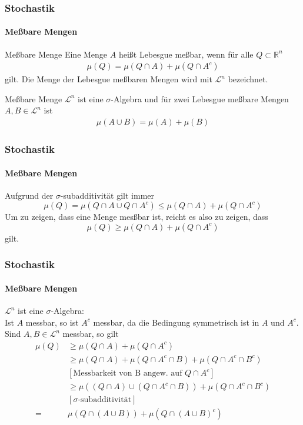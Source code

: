 \documentclass{beamer}
\begin{document}
\begin{frame}
    \frametitle{Stochastik}
\framesubtitle{Meßbare Mengen}
    \begin{block}{Meßbare Menge}
Eine Menge $A$ heißt Lebesgue meßbar, wenn für alle $Q \subset \mathbb{R}^n$
\begin{align*}
\mu(Q) = \mu(Q \cap A) + \mu(Q \cap A^c)  
\end{align*}
gilt. Die Menge der Lebesgue meßbaren Mengen wird mit $\mathcal{L}^n$ bezeichnet.
\end{block}


    \begin{block}{Meßbare Menge}
$\mathcal{L}^n$ ist eine $\sigma$-Algebra und für  zwei Lebesgue meßbare Mengen  $A,B \in \mathcal{L}^n$ ist
\begin{align*}
 \mu(A \cup B) = \mu(A) + \mu(B)
\end{align*}

\end{block}

 \end{frame}


 \begin{frame}
    \frametitle{Stochastik}
\framesubtitle{Meßbare Mengen}
Aufgrund der $\sigma$-subadditivität gilt immer
$$ \mu(Q) = \mu(Q \cap A \cup Q \cap A^c) \leq \mu(Q \cap A) +  \mu(Q \cap A^c) $$
Um zu zeigen, dass eine Menge mesßbar ist, reicht es also zu zeigen, dass 
$$\mu(Q)  \geq \mu(Q \cap A) +  \mu(Q \cap A^c) $$
gilt.
\end{frame}



\begin{frame}
    \frametitle{Stochastik}
\framesubtitle{Meßbare Mengen}
$\mathcal{L}^n$ ist eine $\sigma$-Algebra: \\
Ist $A$ messbar, so ist $A^c$ messbar, da die Bedingung symmetrisch ist in $A$ und $A^c$. \\
Sind $A, B \in \mathcal{L}^n$ messbar, so gilt 
\begin{align*}
    \mu(Q)  & \geq \mu(Q \cap A) +  \mu(Q \cap A^c) \\
    & \geq \mu(Q \cap A ) + \mu(Q \cap A^c  \cap B) + \mu(Q \cap A^c  \cap B^c) \\
    & [\text{Messbarkeit von B angew. auf $Q\cap A^c$}] \\
    & \geq \mu((Q \cap A)  \cup (Q \cap A^c  \cap B)) + \mu(Q \cap A^c  \cap B^c) \\
    & [\text{$\sigma$-subadditivität}] \\
= & \mu(Q \cap (A \cup B))+  \mu(Q \cap (A \cup B)^c) 
\end{align*}
\; \; \; \; \; \; \;     
\end{frame}
\end{document}
